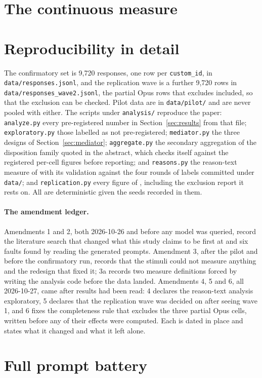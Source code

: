 \section{The continuous measure}



\fi

\onecolumn
\section{Reproducibility in detail}
\label{app:repro}
The confirmatory set is 9{,}720 responses, one row per \texttt{custom\_id}, in
\texttt{data/responses.jsonl}, and the replication wave is a further 9{,}720
rows in \texttt{data/responses\_wave2.jsonl}, the partial Opus rows that
 excludes included, so that the exclusion can be
checked. Pilot data are in \texttt{data/pilot/} and are never pooled with
either. The scripts under \texttt{analysis/} reproduce the
paper: \texttt{analyze.py} every pre-registered number in
Section~\ref{sec:results} from that file; \texttt{exploratory.py} those
labelled as not pre-registered; \texttt{mediator.py} the three designs of
Section~\ref{sec:mediator}; \texttt{aggregate.py} the secondary
aggregation of the disposition family quoted in the abstract, which checks
itself against the registered per-cell figures before reporting; and
\texttt{reasons.py} the reason-text measure of 
with its validation against the four rounds of labels committed under
\texttt{data/}; and \texttt{replication.py} every figure of
, including the exclusion report it rests on. All
are deterministic given the seeds recorded in them.

\paragraph{The amendment ledger.} Amendments 1 and 2, both 2026-10-26 and
before any model was queried, record the literature search that changed what
this study claims to be first at and six faults found by reading the
generated prompts. Amendment 3, after the pilot and before the confirmatory
run, records that the stimuli could not measure anything and the redesign
that fixed it; 3a records two measure definitions forced by writing the
analysis code before the data landed. Amendments 4, 5 and 6, all 2026-10-27,
came after results had been read: 4 declares the reason-text analysis
exploratory, 5 declares that the replication wave was decided on after seeing
wave 1, and 6 fixes the completeness rule that excludes the three partial
Opus cells, written before any of their effects were computed. Each is dated
in place and states what it changed and what it left alone.

\section{Full prompt battery}
\label{app:battery}

